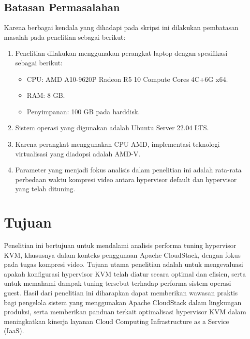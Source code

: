 \subsection{Batasan Permasalahan}
\hspace{0.5cm} Karena berbagai kendala yang dihadapi pada skripsi ini dilakukan pembatasan masalah pada penelitian  sebagai berikut:
\begin{enumerate}
  \item Penelitian dilakukan menggunakan perangkat laptop dengan spesifikasi sebagai berikut:
  \begin{itemize}
    \item CPU: AMD A10-9620P Radeon R5 10 Compute Cores 4C+6G x64.
	\item RAM: 8 GB.
	\item Penyimpanan: 100 GB pada harddisk.
 \end{itemize}
  \item Sistem operasi yang digunakan adalah Ubuntu Server 22.04 LTS.
  \item Karena perangkat menggunakan CPU AMD, implementasi teknologi virtualisasi yang diadopsi adalah AMD-V.
  \item Parameter yang menjadi fokus analisis dalam penelitian ini adalah rata-rata perbedaan waktu kompresi video antara hypervisor default dan hypervisor yang telah dituning.
\end{enumerate}


\section{Tujuan}
\hspace{0.5cm} Penelitian ini bertujuan untuk mendalami analisis performa tuning hypervisor KVM, khususnya dalam konteks penggunaan Apache CloudStack, dengan fokus pada tugas kompresi video. Tujuan utama penelitian adalah untuk mengevaluasi apakah konfigurasi hypervisor KVM telah diatur secara optimal dan efisien, serta untuk memahami dampak tuning tersebut terhadap performa sistem operasi guest. Hasil dari penelitian ini diharapkan dapat memberikan wawasan praktis bagi pengelola sistem yang menggunakan Apache CloudStack dalam lingkungan produksi, serta memberikan panduan terkait optimalisasi hypervisor KVM dalam meningkatkan kinerja layanan Cloud Computing Infrastructure as a Service (IaaS).


